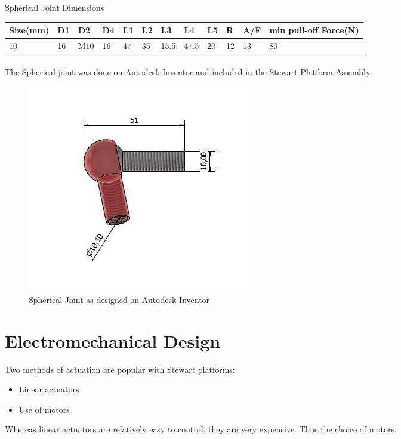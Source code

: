 \begin{table}[H]
\caption{Spherical Joint Dimensions}
\end{table}
\begin{tabular}{|l|l|l|l|l|l|l|l|l|l|l|l|}
\hline
\textbf{Size(mm)}& \textbf{D1}& \textbf{D2}&\textbf{ D4}& \textbf{L1}& \textbf{L2}& \textbf{L3}& \textbf{L4}& \textbf{L5}& \textbf{R} & \textbf{A/F} & \textbf{min pull-off Force(N)}\\
\hline
10 & 16 & M10 & 16 & 47 & 35 & 15.5 & 47.5& 20 & 12 & 13 & 80\\
\hline
\end{tabular}

\paragraph{}

The Spherical joint was done on Autodesk Inventor and included in the Stewart Platform Assembly.
\begin{center}
	\begin{figure}[H]
	\centering
	\includegraphics[width=0.5\linewidth]{Figures/Spherical CAD}
	\caption[Spherical Joint CAD]{Spherical Joint as designed on Autodesk Inventor}
	\end{figure}
\end{center}

\section{Electromechanical Design}
Two methods of actuation are popular with Stewart platforms:
\begin{itemize}
\item Linear actuators
\item Use of motors
\end{itemize}
Whereas linear actuators are relatively easy to control, they are very expensive. Thus the choice of motors.
